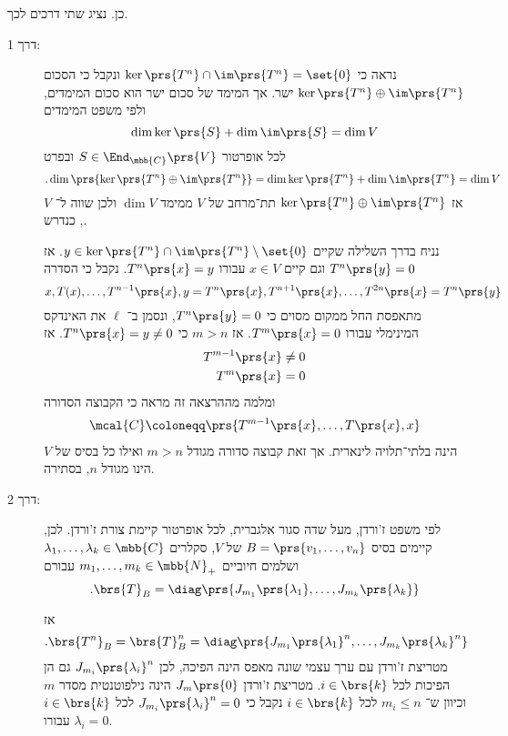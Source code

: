\documentclass[a4paper,10pt,twoside,openany]{article}
\begin{document}
\begin{solution}
כן. נציג שתי דרכים לכך.

\begin{description}
\item[דרך 1:]

נראה כי
$\ker\prs{T^n} \cap \im\prs{T^n} = \set{0}$
ונקבל כי הסכום
$\ker\prs{T^n} \oplus \im\prs{T^n}$
ישר. אך המימד של סכום ישר הוא סכום המימדים, ולפי משפט המימדים
\[\dim \ker\prs{S} + \dim \im \prs{S} = \dim V\]
לכל אופרטור
$S \in \End_{\mbb{C}}\prs{V}$
ובפרט
\[\text{.} \dim\prs{\ker\prs{T^n} \oplus \im\prs{T^n}} = \dim \ker\prs{T^n} + \dim \im \prs{T^n} = \dim V\]
אז
$\ker\prs{T^n} \oplus \im\prs{T^n}$
תת־מרחב של
$V$
ממימד
$\dim V$
ולכן שווה ל־%
$V$,
כנדרש.

נניח בדרך השלילה שקיים
$y \in \ker\prs{T^n} \cap \im\prs{T^n} \setminus \set{0}$.
אז
$T^n\prs{y} = 0$
וגם קיים
$x \in V$
עבורו
$T^n\prs{x} = y$.
נקבל כי הסדרה
\[x, T(x), \ldots, T^{n-1}\prs{x}, y = T^n\prs{x}, T^{n+1}\prs{x}, \ldots, T^{2n}\prs{x} = T^n\prs{y}\]
מתאפסת החל ממקום מסוים כי $T^n\prs{y} = 0$, ונסמן ב־%
$\ell$
את האינדקס המינימלי עבורו
$T^m\prs{x} = 0$.
אז
$m > n$
כי
$T^n\prs{x} = y \neq 0$.
אז
\begin{align*}
T^{m-1}\prs{x} \neq 0 \\
T^m\prs{x} = 0
\end{align*}
ומלמה מההרצאה זה מראה כי הקבוצה הסדורה
\begin{align*}
\mcal{C} \coloneqq \prs{T^{m-1}\prs{x}, \ldots, T\prs{x}, x}
\end{align*}
הינה בלתי־תלויה לינארית.
אך זאת קבוצה סדורה מגודל
$m > n$
ואילו כל בסיס של
$V$
הינו מגודל
$n$,
בסתירה.

\item[דרך 2:]

לפי משפט ז'ורדן, מעל שדה סגור אלגברית, לכל אופרטור קיימת צורת ז'ורדן.
לכן, קיימים בסיס
$B = \prs{v_1, \ldots, v_n}$
של
$V$,
סקלרים
$\lambda_1, \ldots, \lambda_k \in \mbb{C}$
ושלמים חיוביים
$m_1, \ldots, m_k \in \mbb{N}_+$
עבורם
\[\text{.} \brs{T}_B = \diag\prs{J_{m_1}\prs{\lambda_1}, \ldots, J_{m_k}\prs{\lambda_k}}\]

אז
\[\text{.} \brs{T^n}_B = \brs{T}_B^n = \diag\prs{J_{m_1}\prs{\lambda_1}^n, \ldots, J_{m_k}\prs{\lambda_k}^n}\]
מטריצת ז'ורדן עם ערך עצמי שונה מאפס הינה הפיכה, לכן
$J_{m_i}\prs{\lambda_i}^n$
גם הן הפיכות לכל
$i \in \brs{k}$.
מטריצת ז'ורדן
$J_m\prs{0}$
הינה נילפוטנטית מסדר
$m$
וכיוון ש־%
$m_i \leq n$
לכל
$i \in \brs{k}$
נקבל כי
$J_{m_i}\prs{\lambda_i}^n = 0$
לכל
$i \in \brs{k}$
עבורו
$\lambda_i = 0$.


\end{description}
\end{solution}
\end{document}
